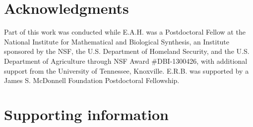 \section*{Acknowledgments}
Part of this work was conducted while E.A.H. was a Postdoctoral Fellow at the National Institute for Mathematical and Biological Synthesis, an Institute sponsored by the NSF, the U.S. Department of Homeland Security, and the U.S. Department of Agriculture through NSF Award \#DBI-1300426, with additional support from the University of Tennessee, Knoxville. E.R.B. was supported by a James S. McDonnell Foundation Postdoctoral Fellowship.

\newpage



\clearpage{}
\renewcommand{\thesection}{}
\section{Supporting information}
\renewcommand{\thesection}{S}
\renewcommand{\thesubsection}{S\arabic{subsection}}
\renewcommand{\theequation}{S\arabic{equation}}
\renewcommand{\thetable}{S\arabic{table}}
\renewcommand{\thefigure}{S\arabic{figure}}
\setcounter{equation}{0}  
\setcounter{figure}{0}
\setcounter{table}{0}

